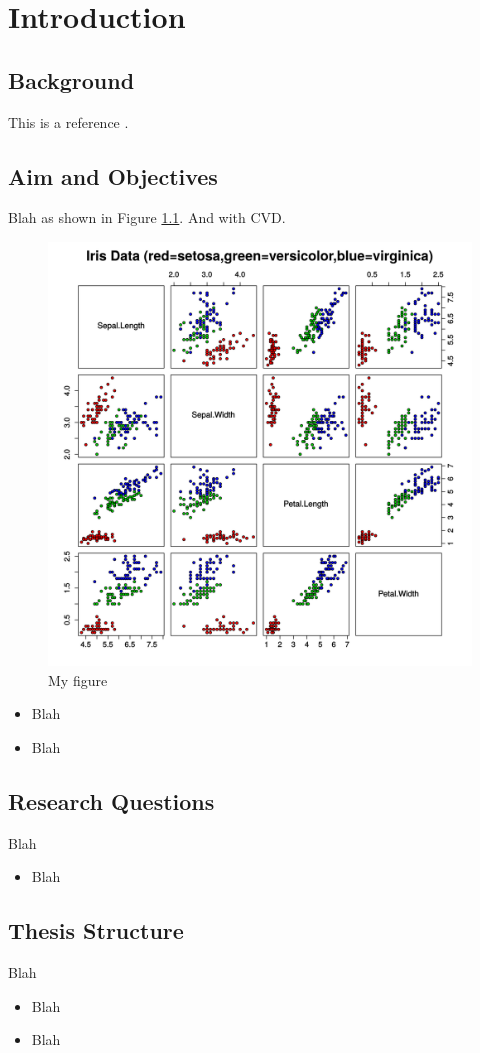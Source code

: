 
\chapter{Introduction}

\section{Background}
This is a reference \cite{van2019sustainable}. 

\section{Aim and Objectives}
Blah as shown in Figure \ref{fig:fig01}. And with \gls{CVD}.

\begin{figure}
  \includegraphics[width=0.9\linewidth]{figures/iris.png}
  \caption{My figure}
  \label{fig:fig01}
\end{figure}


\begin{itemize}
\item Blah
\item Blah
\end{itemize}


\section{Research Questions}
Blah

\begin{itemize}
\item Blah 
\end{itemize}

\section{Thesis Structure}
Blah

\begin{itemize}
\item Blah 
\item Blah 
\end{itemize}


